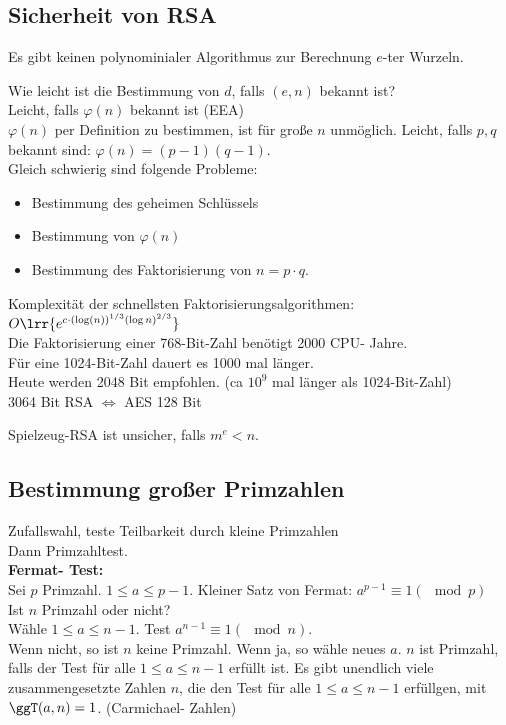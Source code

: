 	\subsection{Sicherheit von RSA}
			\item Es gibt keinen polynominialer Algorithmus zur Berechnung $e$-ter Wurzeln.
			\item Wie leicht ist die Bestimmung von $d$, falls $(e,n)$ bekannt ist?\\
				Leicht, falls $\varphi(n)$ bekannt ist (EEA)\\
				$\varphi(n)$ per Definition zu bestimmen, ist für große $n$ unmöglich. Leicht, falls $p,q$ bekannt sind: $\varphi(n)=(p-1)(q-1)$.\\
				Gleich schwierig sind folgende Probleme:
				\begin{itemize}
					\item Bestimmung des geheimen Schlüssels
					\item Bestimmung von $\varphi(n)$
					\item Bestimmung des Faktorisierung von $n=p\cdot q$.
				\end{itemize}
			\item Komplexität der schnellsten Faktorisierungsalgorithmen:
				$O\lrr{e^{c\cdot(\log(n))^{1/3}(\log n)^{2/3}}}$\\
				Die Faktorisierung einer 768-Bit-Zahl benötigt 2000 CPU- Jahre.\\
				Für eine 1024-Bit-Zahl dauert es 1000 mal länger.\\
				Heute werden 2048 Bit empfohlen. (ca $10^9$ mal länger als 1024-Bit-Zahl)\\
				3064 Bit RSA $\Leftrightarrow$ AES 128 Bit
			\item Spielzeug-RSA ist unsicher, falls $m^e<n$.
		\subExEnd

	\subsection{Bestimmung großer Primzahlen}
		Zufallswahl, teste Teilbarkeit durch kleine Primzahlen\\
		Dann Primzahltest.\\
		\textbf{Fermat- Test:}\\
		Sei $p$ Primzahl. $1\leq a\leq p-1$. Kleiner Satz von Fermat: $a^{p-1}\equiv 1(\mod p)$\\
		Ist $n$ Primzahl oder nicht?\\
		Wähle $1\leq a\leq n-1$. Test $a^{n-1}\equiv 1(\mod n)$.\\
		Wenn nicht, so ist $n$ keine Primzahl. Wenn ja, so wähle neues $a$. $n$ ist Primzahl, falls der Test für alle $1\leq a\leq n-1$ erfüllt ist. Es gibt unendlich viele zusammengesetzte Zahlen $n$, die den Test für alle $1\leq a\leq n-1$ erfüllgen, mit $\ggT(a,n)=1$. (Carmichael- Zahlen)

